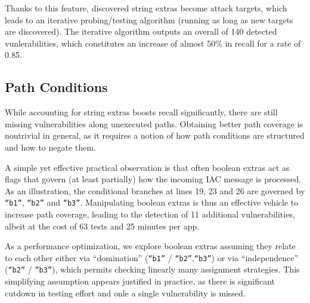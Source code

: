 Thanks to this feature, discovered string extras become attack targets, which leads to an iterative probing/testing algorithm (running as long as new targets are discovered). The iterative algorithm outputs an overall of 140 detected vunlerabilities, which constitutes an increase of almost 50\% in recall for a rate of 0.85.

\subsection{Path Conditions}

While accounting for string extras boosts recall significantly, there are still missing vulnerabilities along unexecuted paths. Obtaining better path coverage is nontrivial in general, as it requires a notion of how path conditions are structured and how to negate them.

A simple yet effective practical observation is that often boolean extras act as flags that govern (at least partially) how the incoming IAC message is processed. As an illustration,
the conditional branches at lines 19, 23 and 26 are governed by {\tt ``b1''}, {\tt ``b2''} and {\tt ``b3''}. Manipulating boolean extras is thus an effective vehicle to increase path coverage, leading to the detection of 11 additional vulnerabilities, albeit at the cost of 63 tests and 25 minutes per app.

As a performance optimization, we explore boolean extras assuming they relate to each other either via ``domination'' ({\tt ``b1''} / {\tt ``b2''},{\tt ``b3''}) or via ``independence''
({\tt ``b2''} / {\tt ``b3''}), which permits checking linearly many assignment strategies. This simplifying assumption appears justified in practice, as there is significant cutdown in testing effort and onle a single vulnerability is missed.